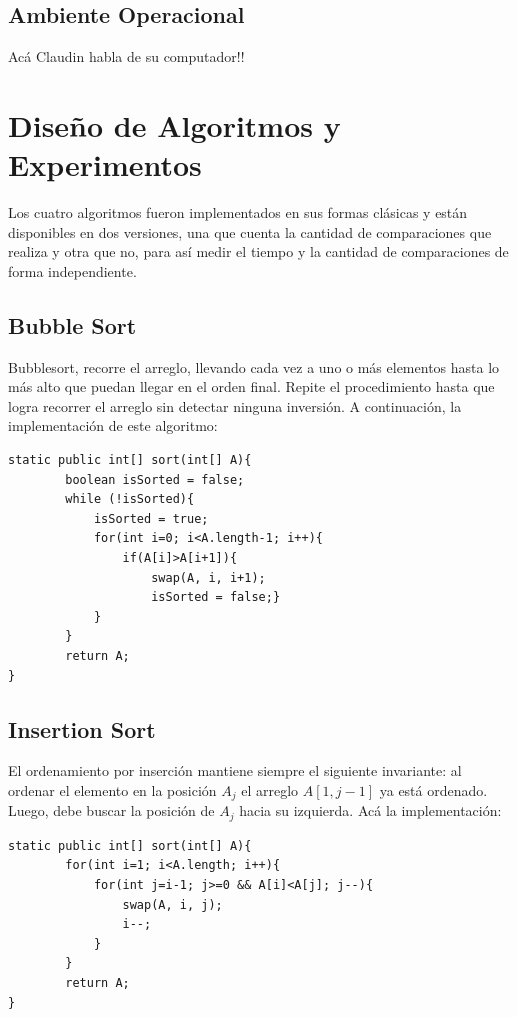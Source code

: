 \documentclass[12pt,letterpaper, margin = 3cm]{article}
\begin{document}
\subsection{Ambiente Operacional}
Acá Claudin habla de su computador!!

\newpage
\section{Diseño de Algoritmos y Experimentos}
Los cuatro algoritmos fueron implementados en sus formas clásicas y están disponibles en dos versiones, una que cuenta la cantidad de comparaciones que realiza y otra que no, para así medir el tiempo y la cantidad de comparaciones de forma independiente.

\subsection{Bubble Sort}

Bubblesort, recorre el arreglo, llevando cada vez a uno o más elementos hasta lo más alto que puedan llegar en el orden final. Repite el procedimiento hasta que logra recorrer el arreglo sin detectar ninguna inversión. A continuación, la implementación de este algoritmo:
\begin{lstlisting}
static public int[] sort(int[] A){
        boolean isSorted = false;
        while (!isSorted){
            isSorted = true;
            for(int i=0; i<A.length-1; i++){
                if(A[i]>A[i+1]){
                    swap(A, i, i+1);
                    isSorted = false;}
            }
        }
        return A;
}
\end{lstlisting}

\subsection{Insertion Sort}

El ordenamiento por inserción mantiene siempre el siguiente invariante: al ordenar el elemento en la posición $A_j$ el arreglo $A[1, j-1]$ ya está ordenado. Luego, debe buscar la posición de $A_j$ hacia su izquierda. Acá la implementación:
\begin{lstlisting}
static public int[] sort(int[] A){
        for(int i=1; i<A.length; i++){
            for(int j=i-1; j>=0 && A[i]<A[j]; j--){
                swap(A, i, j);
                i--;
            }
        }
        return A;
}
\end{lstlisting}
\end{document}
